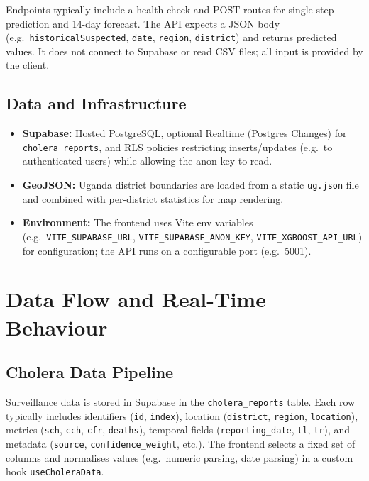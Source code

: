 \documentclass[11pt,a4paper]{article}
\begin{document}
Endpoints typically include a health check and POST routes for single-step prediction and 14-day forecast. The API expects a JSON body (e.g.\ \texttt{historicalSuspected}, \texttt{date}, \texttt{region}, \texttt{district}) and returns predicted values. It does not connect to Supabase or read CSV files; all input is provided by the client.

\subsection{Data and Infrastructure}

\begin{itemize}[noitemsep]
    \item \textbf{Supabase:} Hosted PostgreSQL, optional Realtime (Postgres Changes) for \texttt{cholera\_reports}, and RLS policies restricting inserts/updates (e.g.\ to authenticated users) while allowing the anon key to read.
    \item \textbf{GeoJSON:} Uganda district boundaries are loaded from a static \texttt{ug.json} file and combined with per-district statistics for map rendering.
    \item \textbf{Environment:} The frontend uses Vite env variables (e.g.\ \texttt{VITE\_SUPABASE\_URL}, \texttt{VITE\_SUPABASE\_ANON\_KEY}, \texttt{VITE\_XGBOOST\_API\_URL}) for configuration; the API runs on a configurable port (e.g.\ 5001).
\end{itemize}

\newpage

\section{Data Flow and Real-Time Behaviour}

\subsection{Cholera Data Pipeline}

Surveillance data is stored in Supabase in the \texttt{cholera\_reports} table. Each row typically includes identifiers (\texttt{id}, \texttt{index}), location (\texttt{district}, \texttt{region}, \texttt{location}), metrics (\texttt{sch}, \texttt{cch}, \texttt{cfr}, \texttt{deaths}), temporal fields (\texttt{reporting\_date}, \texttt{tl}, \texttt{tr}), and metadata (\texttt{source}, \texttt{confidence\_weight}, etc.). The frontend selects a fixed set of columns and normalises values (e.g.\ numeric parsing, date parsing) in a custom hook \texttt{useCholeraData}.
\end{document}

